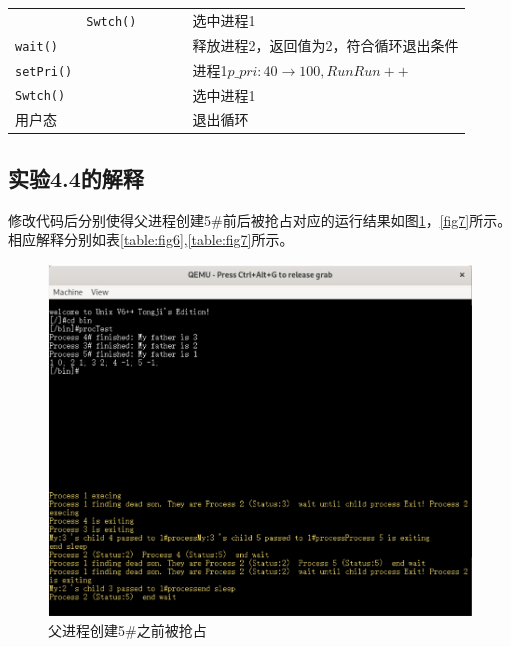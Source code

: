 \begin{landscape}
\begin{longtable}{llllll}
                 &                \texttt{Swtch()}   &                &           &             &选中进程1\\
                \texttt{wait()} &                  &                &           &             &释放进程2，返回值为2，符合循环退出条件\\
    \texttt{setPri()} &                  &                &           &             &进程1$p\_pri:40\rightarrow 100,RunRun++$\\
    \texttt{Swtch()} &                  &                &           &             &选中进程1\\
    用户态 &                  &                &           &             &退出循环\\\bottomrule
    \end{longtable}
\end{landscape}

\subsection{实验4.4的解释}

修改代码后分别使得父进程创建5\#前后被抢占对应的运行结果如图\ref{fig6}，\ref{fig7}所示。
相应解释分别如表\ref{table:fig6},\ref{table:fig7}所示。

\begin{figure}[!htbp]
    \centering
    \includegraphics[width=\textwidth]{images/fig6.png}
    \caption{父进程创建5\#之前被抢占}\label{fig6}
\end{figure}

